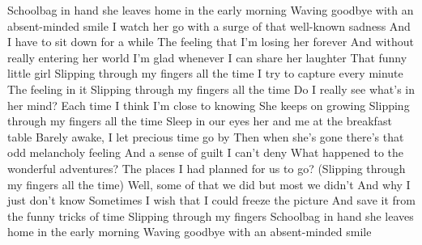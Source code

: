 \ve{}
Schoolbag in hand
she leaves home in the early morning
Waving goodbye with an absent-minded smile
I watch her go with a surge
of that well-known sadness
And I have to sit down for a while
The feeling that I'm losing her forever
And without really entering her world
I'm glad whenever I can share her laughter
That funny little girl
\cho{}
Slipping through my fingers all the time
I try to capture every minute
The feeling in it
Slipping through my fingers all the time
Do I really see what's in her mind?
Each time I think I'm close to knowing
She keeps on growing
Slipping through my fingers all the time
\ve{}
Sleep in our eyes
her and me at the breakfast table
Barely awake, I let precious time go by
Then when she's gone
there's that odd melancholy feeling
And a sense of guilt I can't deny
What happened to the wonderful adventures?
The places I had planned for us to go?
(Slipping through my fingers all the time)
Well, some of that we did
but most we didn't
And why I just don't know
\cho{}
Sometimes I wish that I could freeze the picture
And save it from the funny tricks of time
Slipping through my fingers
\ve{}
Schoolbag in hand
she leaves home in the early morning
Waving goodbye with an absent-minded smile
\esong{}